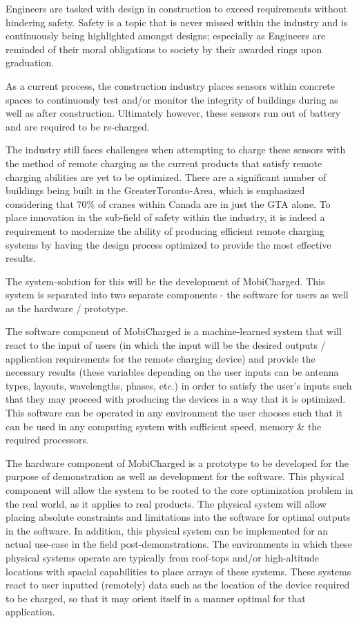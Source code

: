 \documentclass[12pt, titlepage]{article}
\begin{document}
Engineers are tasked with design in construction to exceed requirements without hindering safety. Safety is a topic that is never missed within the industry and is continuously being highlighted amongst designs; especially as Engineers are reminded of their moral obligations to society by their awarded rings upon graduation. 
\par
As a current process, the construction industry places sensors within concrete spaces to continuously test and/or monitor the integrity of buildings during as well as after construction. Ultimately however, these sensors run out of battery and are required to be re-charged.
\par
The industry still faces challenges when attempting to charge these sensors with the method of remote charging as the current products that satisfy remote charging abilities are yet to be optimized. There are a significant number of buildings being built in the GreaterToronto-Area, which is emphasized considering that 70\% of cranes within Canada are in just the GTA alone. To place innovation in the sub-field of safety within the industry, it is indeed a requirement to modernize the ability of producing efficient remote charging systems by having the design process optimized to provide the most effective results.
\par
The system-solution for this will be the development of MobiCharged. This system is separated into two separate components - the software for users as well as the hardware / prototype. 
\par
The software component of MobiCharged is a machine-learned system that will react to the input of users (in which the input will be the desired outputs / application requirements for the remote charging device) and provide the necessary results (these variables depending on the user inputs can be antenna types, layouts, wavelengths, phases, etc.)  in order to satisfy the user’s inputs such that they may proceed with producing the devices in a way that it is optimized. This software can be operated in any environment the user chooses such that it can be used in any computing system with sufficient speed, memory \& the required processors. 
\par
The hardware component of MobiCharged is a prototype to be developed for the purpose of demonstration as well as development for the software. This physical component will allow the system to be rooted to the core optimization problem in the real world, as it applies to real products. The physical system will allow placing absolute constraints and limitations into the software for optimal outputs in the software. In addition, this physical system can be implemented for an actual use-case in the field post-demonstrations. The environments in which these physical systems operate are typically from roof-tops and/or high-altitude locations with spacial capabilities to place arrays of these systems. These systems react to user inputted (remotely) data such as the location of the device required to be charged, so that it may orient itself in a manner optimal for that application. 
\end{document}
